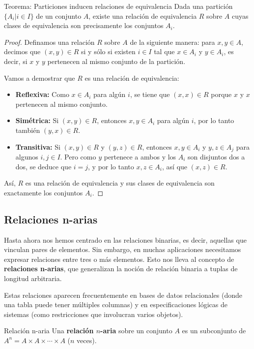 \begin{thmblock}{Teorema: Particiones inducen relaciones de equivalencia}
Dada una partición $\{A_i | i \in I\}$ de un conjunto $A$, existe una relación de equivalencia $R$ sobre $A$ cuyas clases de equivalencia son precisamente los conjuntos $A_i$.
\end{thmblock}
\begin{proof}
Definamos una relación $R$ sobre $A$ de la siguiente manera: para $x, y \in A$, decimos que $(x,y) \in R$ si y sólo si existen $i \in I$ tal que $x \in A_i$ y $y \in A_i$, es decir, si $x$ y $y$ pertenecen al mismo conjunto de la partición.

Vamos a demostrar que $R$ es una relación de equivalencia:
\begin{itemize}
  \item \textbf{Reflexiva:} Como $x \in A_i$ para algún $i$, se tiene que $(x,x) \in R$ porque $x$ y $x$ pertenecen al mismo conjunto.
  \item \textbf{Simétrica:} Si $(x,y) \in R$, entonces $x,y \in A_i$ para algún $i$, por lo tanto también $(y,x) \in R$.
  \item \textbf{Transitiva:} Si $(x,y) \in R$ y $(y,z) \in R$, entonces $x,y \in A_i$ y $y,z \in A_j$ para algunos $i,j \in I$. Pero como $y$ pertenece a ambos y los $A_i$ son disjuntos dos a dos, se deduce que $i = j$, y por lo tanto $x,z \in A_i$, así que $(x,z) \in R$.
\end{itemize}
Así, $R$ es una relación de equivalencia y sus clases de equivalencia son exactamente los conjuntos $A_i$.
\end{proof}

\subsection{Relaciones n-arias}
Hasta ahora nos hemos centrado en las relaciones binarias, es decir, aquellas que vinculan pares de elementos. Sin embargo, en muchas aplicaciones necesitamos expresar relaciones entre tres o más elementos. Esto nos lleva al concepto de \textbf{relaciones n-arias}, que generalizan la noción de relación binaria a tuplas de longitud arbitraria.

Estas relaciones aparecen frecuentemente en bases de datos relacionales (donde una tabla puede tener múltiples columnas) y  en especificaciones lógicas de sistemas (como restricciones que involucran varios objetos).


\begin{definitionblock}{Relación n-aria}
Una \textbf{relación $n$-aria} sobre un conjunto $A$ es un subconjunto de $A^n = A \times A \times \cdots \times A$ ($n$ veces).
\end{definitionblock}


